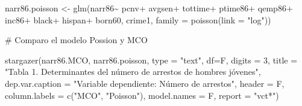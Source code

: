 \documentclass[
  letterpaper,
  DIV=11,
  numbers=noendperiod]{scrreprt}
\newenvironment{Shaded}{\begin{snugshade}}{\end{snugshade}}
\newcommand{\AttributeTok}[1]{\textcolor[rgb]{0.40,0.45,0.13}{#1}}
\newcommand{\CommentTok}[1]{\textcolor[rgb]{0.37,0.37,0.37}{#1}}
\newcommand{\DecValTok}[1]{\textcolor[rgb]{0.68,0.00,0.00}{#1}}
\newcommand{\FunctionTok}[1]{\textcolor[rgb]{0.28,0.35,0.67}{#1}}
\newcommand{\NormalTok}[1]{\textcolor[rgb]{0.00,0.23,0.31}{#1}}
\newcommand{\OtherTok}[1]{\textcolor[rgb]{0.00,0.23,0.31}{#1}}
\newcommand{\SpecialCharTok}[1]{\textcolor[rgb]{0.37,0.37,0.37}{#1}}
\newcommand{\StringTok}[1]{\textcolor[rgb]{0.13,0.47,0.30}{#1}}
\begin{document}
\begin{Shaded}
\begin{Highlighting}[]
\NormalTok{narr86.poisson }\OtherTok{\textless{}{-}} \FunctionTok{glm}\NormalTok{(narr86}\SpecialCharTok{\textasciitilde{}}
\NormalTok{                   pcnv}\SpecialCharTok{+}
\NormalTok{                   avgsen}\SpecialCharTok{+}
\NormalTok{                   tottime}\SpecialCharTok{+}
\NormalTok{                   ptime86}\SpecialCharTok{+}
\NormalTok{                   qemp86}\SpecialCharTok{+}
\NormalTok{                   inc86}\SpecialCharTok{+}
\NormalTok{                   black}\SpecialCharTok{+}
\NormalTok{                   hispan}\SpecialCharTok{+}
\NormalTok{                   born60,}
\NormalTok{                 crime1,}
                 \AttributeTok{family =} \FunctionTok{poisson}\NormalTok{(}\AttributeTok{link =} \StringTok{"log"}\NormalTok{))}

\CommentTok{\# Comparo el modelo Possion y MCO}

\FunctionTok{stargazer}\NormalTok{(narr86.MCO, narr86.poisson, }
          \AttributeTok{type =} \StringTok{"text"}\NormalTok{,}
          \AttributeTok{df=}\NormalTok{F,}
          \AttributeTok{digits =} \DecValTok{3}\NormalTok{,}
          \AttributeTok{title =} \StringTok{"Tabla 1. Determinantes del número de arrestos de hombres jóvenes"}\NormalTok{,}
          \AttributeTok{dep.var.caption =} \StringTok{"Variable dependiente: Número de arrestos"}\NormalTok{,}
          \AttributeTok{header =}\NormalTok{ F,}
          \AttributeTok{column.labels =} \FunctionTok{c}\NormalTok{(}\StringTok{"MCO"}\NormalTok{, }\StringTok{"Poisson"}\NormalTok{),}
          \AttributeTok{model.names =}\NormalTok{ F,}
          \AttributeTok{report =} \StringTok{"vct*"}\NormalTok{)}
\end{Highlighting}
\end{Shaded}
\end{document}
